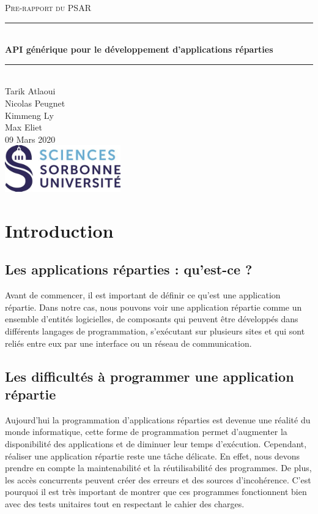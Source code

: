 \documentclass{article}
\date{\today}
\author{Tarik Atlaoui \\ Nicolas Peugnet \\ Kimmeng Ly \\ Max Eliet}
\begin{document}
\begin{titlepage}
	\enlargethispage{2cm}
	\newcommand{\HRule}{\rule{\linewidth}{0.5mm}}
	\center
	\textsc{\LARGE
	Pre-rapport du PSAR 
	} \\[1cm]
	\HRule \\[0.4cm]
	{ \huge \bfseries API générique pour le développement d'applications réparties \\[0.15cm] }
	\HRule \\[4cm]
	\large{Tarik Atlaoui \\[3mm] Nicolas Peugnet \\[3mm] Kimmeng Ly \\[3mm] Max Eliet} \\[3cm]
	09 Mars 2020 \\[3cm]
	\hfill \includegraphics[width=5cm]{logoSU.jpg}
\end{titlepage}

	\newpage
		\section{Introduction}
			\subsection{Les applications réparties : qu'est-ce ?}
			\large{ Avant de commencer, il est important de définir ce qu’est une application répartie. Dans notre cas, nous pouvons voir une application répartie comme un ensemble d’entités logicielles, de composants qui peuvent être développés dans différents langages de programmation, s’exécutant sur plusieurs sites et qui sont reliés entre eux par une interface ou un réseau de communication.}
			\subsection{Les difficultés à programmer une application répartie}
			\large { Aujourd’hui la programmation d’applications réparties est devenue une réalité du monde informatique, cette forme de programmation permet d'augmenter la disponibilité des applications et de diminuer leur temps d'exécution. Cependant, réaliser une application répartie reste une tâche délicate. En effet, nous devons prendre en compte la maintenabilité et la réutilisabilité des programmes. De plus, les accès concurrents peuvent créer des erreurs et des sources d'incohérence. C’est pourquoi il est très important de montrer que ces programmes fonctionnent bien avec des tests unitaires tout en respectant le cahier des charges.}
\end{document}
